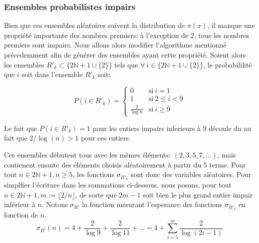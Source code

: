 \documentclass[../main.tex]{report}
\begin{document}
    \label{sec:odd_prob}
\subsubsection{Ensembles probabilistes impairs}
Bien que ces ensembles aléatoires suivent la distribution de $\pi(x)$, il manque une propriété importante des nombres premiers: à l'exception de $2$, tous les nombres premiers sont impairs.
Nous allons alors modifier l'algorithme mentionné précedemment afin de générer des ensembles ayant cette propriété. 
Soient alors les ensembles $R'_{k} \subset \{2\mathbb{N}+1 \cup \{2\}\}$ tels que $\forall~i \in \{2\mathbb{N}+1 \cup \{2\}\}$, le probabililité que $i$ soit dans l'ensemble $R'_{k}$ soit:

\[
P(i \in R'_{k}) = 
\left\{ 
    \begin{array}{cl}
         0 & \mbox{si}~i = 1 \\
         1 & \mbox{si}~ 2 \leq i < 9 \\
         \frac{2}{\log n} & \mbox{si}~i \geq 9
    \end{array}
\right.
\]

Le fait que $P(i \in R'_{k}) = 1$ pour les entiers impairs inferieurs à 9 découle du au fait que $2/\log(n) > 1$ pour ces entiers.

Ces ensembles débutent tous avec les mêmes éléments: $ (2,3,5,7,...) $, mais contienent ensuite des éléments choisis aléatoirement à partir du 5 terme. 
Pour tout $n \in 2\mathbb{N}+1, n\geq 5$, les fonctions $\sigma_{R'_k}$ sont donc des variables aléatoires. Pour simplfier l'écriture dans les sommations ci-dessous, nous posons, pour tout $n \in 2\mathbb{N} + 1, m:= \lfloor 2/n \rfloor$, de sorte que $2m-1$ soit bien le plus grand entier impair inférieur à $n$.
Notons $\sigma_{R'}$ la fonction mesurant l'esperance des fonctions $\sigma_{R'_k}$ en fonction de $n$.
\[
\sigma_{R'}(n)
= 4 + \frac{2}{\log 9} + \frac{2}{\log 11} + ...
= 4 + \sum_{i=5}^m \frac{2}{\log (2i-1)}
\]
\end{document}
